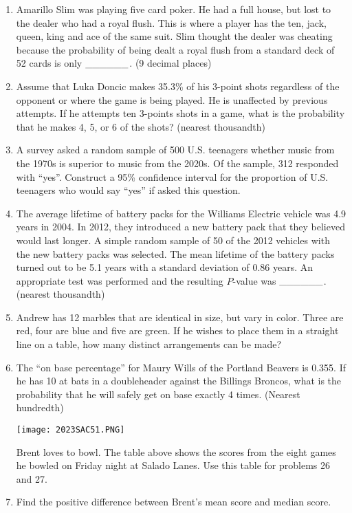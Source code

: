 \documentclass[../uilmath.tex]{subfiles}
\begin{document}
\begin{enumerate}[label=\bfseries\arabic*.]
    \item %
    Amarillo Slim was playing five card poker. He had a full house, but lost to the dealer who had a royal flush. This is where a player 
    has the ten, jack, queen, king and ace of the same suit. Slim thought the dealer was cheating because the probability of being dealt a royal flush from a standard deck of 52 cards 
    is only $\_\_\_\_\_\_$. (9 decimal places)

    \item %
    Assume that Luka Doncic makes 35.3\% of his 3-point shots regardless of the opponent or where the game is being played. He is 
    unaffected by previous attempts. If he attempts ten 3-points shots in a game, what is the probability that he makes 4, 5, or 6 of the shots? (nearest thousandth)

    \item %
    A survey asked a random sample of 500 U.S. teenagers whether music from the 1970s is superior to music from the 2020s.
    Of the sample, 312 responded with ``yes''. Construct a 95\% confidence interval for the proportion of U.S. teenagers who would say 
    ``yes'' if asked this question.

    \item %
    The average lifetime of battery packs for the Williams Electric vehicle was 4.9 years in 2004. In 2012, they introduced 
    a new battery pack that they believed would last longer. A simple random sample of 50 of the 2012 vehicles with the new battery 
    packs was selected. The mean lifetime of the battery packs turned out to be 5.1 years with a standard deviation of 0.86 years. An appropriate
    test was performed and the resulting $P$-value was $\_\_\_\_\_\_$. (nearest thousandth)

    \item %
    Andrew has 12 marbles that are identical in size, but vary in color. Three are red, four are blue and five are green.
    If he wishes to place them in a straight line on a table, how many distinct arrangements can be made?

    \item %
    The ``on base percentage'' for Maury Wills of the Portland Beavers is 0.355. If he has 10 at bats in a doubleheader 
    against the Billings Broncos, what is the probability that he will safely get on base exactly 4 times. (Nearest hundredth)


    \begin{center}
        \texttt{[image: 2023SAC51.PNG]}
    \end{center}
    Brent loves to bowl. The table above shows the scores from the eight games he bowled on Friday night at 
    Salado Lanes. Use this table for problems 26 and 27.
    \item %
    Find the positive difference between Brent's mean score and median score.


\end{enumerate}
\end{document}
